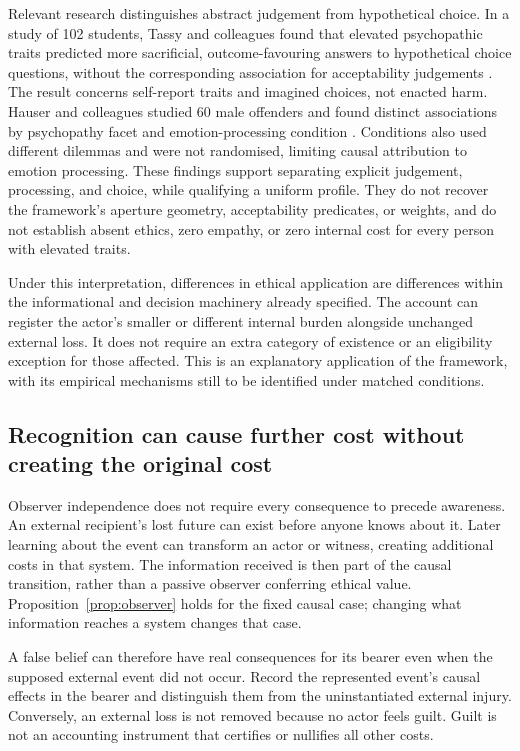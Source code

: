 \documentclass[11pt,a4paper]{article}
\theoremstyle{remark}
\begin{document}
Relevant research distinguishes abstract judgement from hypothetical choice.
In a study of 102 students, Tassy and colleagues found that elevated psychopathic
traits predicted more sacrificial, outcome-favouring answers to hypothetical
choice questions, without the corresponding association for acceptability
judgements \citep{tassy2013choice}. The result concerns self-report traits and
imagined choices, not enacted harm. Hauser and colleagues studied 60 male
offenders and found distinct associations by psychopathy facet and
emotion-processing condition \citep{hauser2021subcomponents}. Conditions also
used different dilemmas and were not randomised, limiting causal attribution
to emotion processing. These findings support separating
explicit judgement, processing, and choice, while qualifying a uniform profile.
They do not recover the framework's aperture geometry, acceptability predicates,
or weights, and do not establish absent ethics, zero empathy, or zero internal
cost for every person with elevated traits.

Under this interpretation, differences in ethical application are differences
within the informational and decision machinery already specified. The account
can register the actor's smaller or different internal burden alongside unchanged
external loss. It does not require an extra category of existence or an eligibility
exception for those affected. This is an explanatory application of the framework,
with its empirical mechanisms still to be identified under matched conditions.

\subsection{Recognition can cause further cost without creating the original cost}

Observer independence does not require every consequence to precede awareness.
An external recipient's lost future can exist before anyone knows about it.
Later learning about the event can transform an actor or witness, creating
additional costs in that system. The information received is then part of the
causal transition, rather than a passive observer conferring ethical value.
Proposition~\ref{prop:observer} holds for the fixed causal case; changing what
information reaches a system changes that case.

A false belief can therefore have real consequences for its bearer even when
the supposed external event did not occur. Record the represented event's
causal effects in the bearer and distinguish them from the uninstantiated
external injury. Conversely, an external loss is not removed because no actor
feels guilt. Guilt is not an accounting instrument that certifies or nullifies
all other costs.
\end{document}

